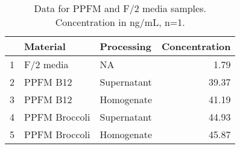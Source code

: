 \begin{table}[H]
\centering
\begin{tabular}{rllr}
  \hline
 & Material & Processing & Concentration \\ 
  \hline
1 & F/2 media & NA & 1.79 \\ 
  2 & PPFM B12 & Supernatant & 39.37 \\ 
  3 & PPFM B12 & Homogenate & 41.19 \\ 
  4 & PPFM Broccoli & Supernatant & 44.93 \\ 
  5 & PPFM Broccoli & Homogenate & 45.87 \\ 
   \hline
\end{tabular}
\caption{Data for PPFM and F/2 media samples. Concentration in ng/mL, n=1.} 
\label{tab:PPFMrevised}
\end{table}
